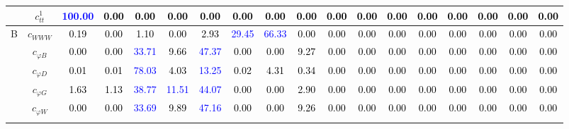 \documentclass{article}
\begin{document}
\begin{landscape}
\begin{table}[H]
\begin{tabular}{|c|c|c|c|c|c|c|c|c|c|c|c|c|c|c|c|c|c|}
 & $c_{tt}^{1}$ & \textcolor{blue}{100.00} & \textcolor{black}{0.00} & \textcolor{black}{0.00} & \textcolor{black}{0.00} & \textcolor{black}{0.00} & \textcolor{black}{0.00} & \textcolor{black}{0.00} & \textcolor{black}{0.00} & \textcolor{black}{0.00} & \textcolor{black}{0.00} & \textcolor{black}{0.00} & \textcolor{black}{0.00} & \textcolor{black}{0.00} & \textcolor{black}{0.00} & \textcolor{black}{0.00} & \textcolor{black}{0.00}\\ \hline
\multirow{7}{*}{B}
 & $c_{WWW}$ & \textcolor{black}{0.19} & \textcolor{black}{0.00} & \textcolor{black}{1.10} & \textcolor{black}{0.00} & \textcolor{black}{2.93} & \textcolor{blue}{29.45} & \textcolor{blue}{66.33} & \textcolor{black}{0.00} & \textcolor{black}{0.00} & \textcolor{black}{0.00} & \textcolor{black}{0.00} & \textcolor{black}{0.00} & \textcolor{black}{0.00} & \textcolor{black}{0.00} & \textcolor{black}{0.00} & \textcolor{black}{0.00}\\ \cline{2-18}
 & $c_{\varphi B}$ & \textcolor{black}{0.00} & \textcolor{black}{0.00} & \textcolor{blue}{33.71} & \textcolor{black}{9.66} & \textcolor{blue}{47.37} & \textcolor{black}{0.00} & \textcolor{black}{0.00} & \textcolor{black}{9.27} & \textcolor{black}{0.00} & \textcolor{black}{0.00} & \textcolor{black}{0.00} & \textcolor{black}{0.00} & \textcolor{black}{0.00} & \textcolor{black}{0.00} & \textcolor{black}{0.00} & \textcolor{black}{0.00}\\ \cline{2-18}
 & $c_{\varphi D}$ & \textcolor{black}{0.01} & \textcolor{black}{0.01} & \textcolor{blue}{78.03} & \textcolor{black}{4.03} & \textcolor{blue}{13.25} & \textcolor{black}{0.02} & \textcolor{black}{4.31} & \textcolor{black}{0.34} & \textcolor{black}{0.00} & \textcolor{black}{0.00} & \textcolor{black}{0.00} & \textcolor{black}{0.00} & \textcolor{black}{0.00} & \textcolor{black}{0.00} & \textcolor{black}{0.00} & \textcolor{black}{0.00}\\ \cline{2-18}
 & $c_{\varphi G}$ & \textcolor{black}{1.63} & \textcolor{black}{1.13} & \textcolor{blue}{38.77} & \textcolor{blue}{11.51} & \textcolor{blue}{44.07} & \textcolor{black}{0.00} & \textcolor{black}{0.00} & \textcolor{black}{2.90} & \textcolor{black}{0.00} & \textcolor{black}{0.00} & \textcolor{black}{0.00} & \textcolor{black}{0.00} & \textcolor{black}{0.00} & \textcolor{black}{0.00} & \textcolor{black}{0.00} & \textcolor{black}{0.00}\\ \cline{2-18}
 & $c_{\varphi W}$ & \textcolor{black}{0.00} & \textcolor{black}{0.00} & \textcolor{blue}{33.69} & \textcolor{black}{9.89} & \textcolor{blue}{47.16} & \textcolor{black}{0.00} & \textcolor{black}{0.00} & \textcolor{black}{9.26} & \textcolor{black}{0.00} & \textcolor{black}{0.00} & \textcolor{black}{0.00} & \textcolor{black}{0.00} & \textcolor{black}{0.00} & \textcolor{black}{0.00} & \textcolor{black}{0.00} & \textcolor{black}{0.00}\\ \cline{2-18}

\end{tabular}
\end{table}
\end{landscape}
\end{document}
